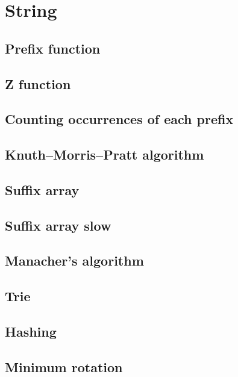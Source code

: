 \section{String}

\subsection{Prefix function}

\subsection{Z function}

\subsection{Counting occurrences of each prefix}

\subsection{Knuth–Morris–Pratt algorithm}

\subsection{Suffix array}

\subsection{Suffix array slow}

\subsection{Manacher's algorithm}

\subsection{Trie}

\subsection{Hashing}

\subsection{Minimum rotation}
